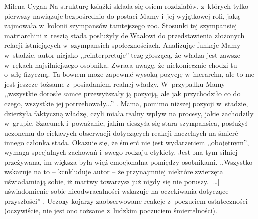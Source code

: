 \begin{newrevplenv}{Milena Cygan}
Na strukturę książki składa się osiem rozdziałów, z~których tylko pierwszy nawiązuje bezpośrednio do postaci Mamy i~jej wyjątkowej roli, jaką zajmowała w~kolonii szympansów tamtejszego zoo. Stosunki tej szympansiej matriarchini z~resztą stada posłużyły de Waalowi do przedstawienia złożonych relacji istniejących w~szympansich społecznościach. Analizując funkcje Mamy w~stadzie, autor niejako ,,reinterpretuje'' tezę głoszącą, że władza jest zawsze w~rękach najsilniejszego osobnika. Zwraca uwagę, że niekoniecznie chodzi tu o~siłę fizyczną. Ta bowiem może zapewnić wysoką pozycję w~hierarchii, ale to nie jest jeszcze tożsame z~posiadaniem realnej władzy. W~przypadku Mamy ,,wszystkie dorosłe samce przewyższały ją pozycją, ale jak przychodziło co do czego, wszystkie jej potrzebowały...''
\parencite[][s.~51]{waal_ostatni_2019}. %
 Mama, pomimo niższej pozycji w~stadzie, dzierżyła faktyczną władzę, czyli miała realny wpływ na procesy, jakie zachodziły w~grupie. Szacunek i~poważanie, jakim cieszyła się stara szympansica, posłużył uczonemu do ciekawych obserwacji dotyczących reakcji naczelnych na śmierć innego członka stada. Okazuje się, że śmierć nie jest wydarzeniem ,,obojętnym'', wymaga specjalnych zachowań i~swego rodzaju etykiety. Jest ona tym silniej przeżywana, im większa była więź emocjonalna pomiędzy osobnikami. ,,Wszystko wskazuje na to -- konkluduje autor -- że przynajmniej niektóre zwierzęta uświadamiają sobie, iż martwy towarzysz już nigdy się nie poruszy. […] uświadomienie sobie nieodwracalności wskazuje na oczekiwania dotyczące przyszłości'' 
\parencite[][s.~55]{waal_ostatni_2019}. %
 Uczony kojarzy zaobserwowane reakcje z~poczuciem ostateczności (oczywiście, nie jest ono tożsame z~ludzkim poczuciem śmiertelności).


\end{newrevplenv}

